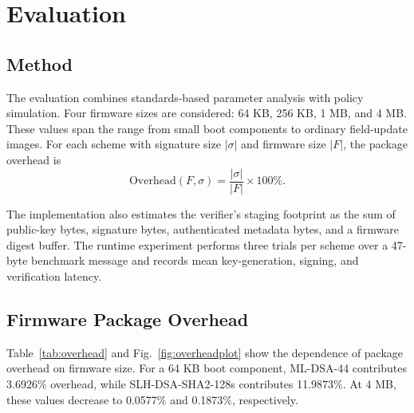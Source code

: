 \FloatBarrier
\section{Evaluation}

\subsection{Method}

The evaluation combines standards-based parameter analysis with policy simulation. Four firmware sizes are considered: 64 KB, 256 KB, 1 MB, and 4 MB. These values span the range from small boot components to ordinary field-update images. For each scheme with signature size $|\sigma|$ and firmware size $|F|$, the package overhead is
\begin{equation}
\text{Overhead}(F,\sigma) = \frac{|\sigma|}{|F|}\times 100\%.
\label{eq:overhead}
\end{equation}

The implementation also estimates the verifier's staging footprint as the sum of public-key bytes, signature bytes, authenticated metadata bytes, and a firmware digest buffer. The runtime experiment performs three trials per scheme over a 47-byte benchmark message and records mean key-generation, signing, and verification latency.

\subsection{Firmware Package Overhead}

Table~\ref{tab:overhead} and Fig.~\ref{fig:overheadplot} show the dependence of package overhead on firmware size. For a 64 KB boot component, ML-DSA-44 contributes 3.6926\% overhead, while SLH-DSA-SHA2-128s contributes 11.9873\%. At 4 MB, these values decrease to 0.0577\% and 0.1873\%, respectively.

\begin{table}[H]
\caption{Signature Overhead Across Firmware Sizes}
\label{tab:overhead}
\centering
\scriptsize
\setlength{\tabcolsep}{2.5pt}
\end{table}

